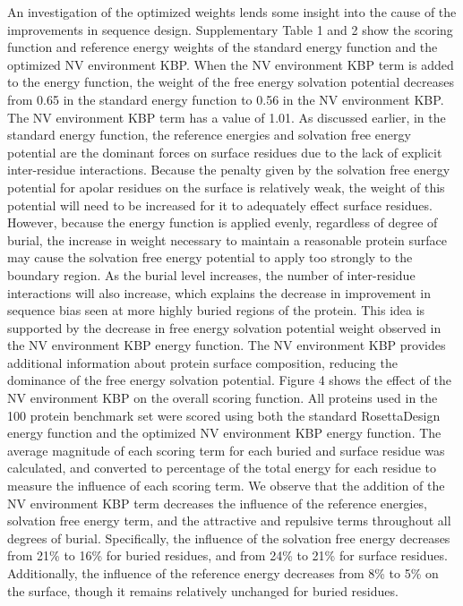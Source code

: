 An investigation of the optimized weights lends some insight into the cause of the improvements in sequence design.
Supplementary Table 1 and 2 show the scoring function and reference energy weights of the standard energy function and the optimized NV environment KBP.
When the NV environment KBP term is added to the energy function, the weight of the free energy solvation potential decreases from 0.65 in the standard energy function to 0.56 in the NV environment KBP. 
The NV environment KBP term has a value of 1.01.
As discussed earlier, in the standard energy function, the reference energies and solvation free energy potential are the dominant forces on surface residues due to the lack of explicit inter-residue interactions.
Because the penalty given by the solvation free energy potential for apolar residues on the surface is relatively weak, the weight of this potential will need to be increased for it to adequately effect surface residues.
However, because the energy function is applied evenly, regardless of degree of burial, the increase in weight necessary to maintain a reasonable protein surface may cause the solvation free energy potential to apply too strongly to the boundary region.
As the burial level increases, the number of inter-residue interactions will also increase, which explains the decrease in improvement in sequence bias seen at more highly buried regions of the protein.
This idea is supported by the decrease in free energy solvation potential weight observed in the NV environment KBP energy function.
The NV environment KBP provides additional information about protein surface composition, reducing the dominance of the free energy solvation potential.
Figure 4 shows the effect of the NV environment KBP on the overall scoring function.
All proteins used in the 100 protein benchmark set were scored using both the standard RosettaDesign energy function and the optimized NV environment KBP energy function. 
The average magnitude of each scoring term for each buried and surface residue was calculated, and converted to percentage of the total energy for each residue to measure the influence of each scoring term.
We observe that the addition of the NV environment KBP term decreases the influence of the reference energies, solvation free energy term, and the attractive and repulsive terms throughout all degrees of burial.
Specifically, the influence of the solvation free energy decreases from 21\% to 16\% for buried residues, and from 24\% to 21\% for surface residues.
Additionally, the influence of the reference energy decreases from 8\% to 5\% on the surface, though it remains relatively unchanged for buried residues.
